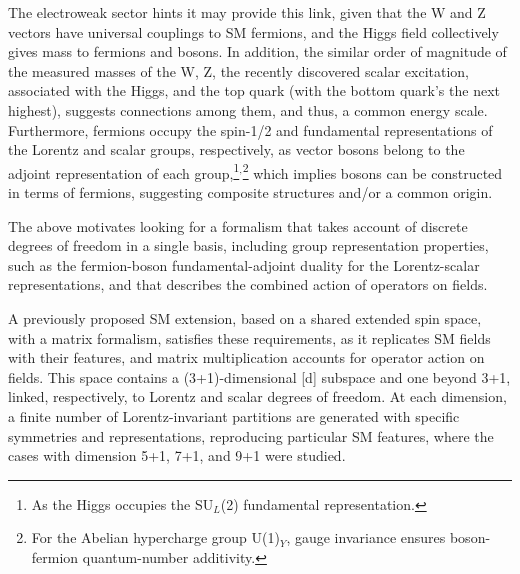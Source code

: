 \documentclass[12pt]{article}
\renewcommand\[{\begin{dmath}}
\renewcommand\]{\end{dmath}}
\begin{document}

 The electroweak sector hints it  may provide this    link, given that  the  W and Z  vectors have  universal couplings to SM fermions, and  the Higgs field  collectively   gives mass to fermions and bosons.
In addition, the similar order of magnitude of the  measured masses\cite{ParticleData}   of  the W, Z,     the recently discovered  scalar  excitation, associated  with
the Higgs\cite{HiggsIndi}, and the top quark (with the bottom quark's  the next highest),
 suggests   connections among them, and thus, a  common  energy  scale.
Furthermore,  fermions occupy the  spin-1/2 and fundamental representations of  the Lorentz and  scalar groups,
   respectively,   as  vector bosons  belong to the    adjoint representation of each group,\footnote{As the Higgs occupies the SU$_L$(2) fundamental representation.}$^,$\footnote{For the Abelian  hypercharge group U(1)$_Y$, gauge invariance ensures boson-fermion  quantum-number  additivity.}   which implies  bosons   can be constructed in terms of fermions,
 suggesting  composite structures and/or a  common  origin.

The above motivates looking for   a formalism that  takes account of discrete degrees of freedom  in a single basis,  including   group representation properties, such as
  the fermion-boson fundamental-adjoint duality for   the Lorentz-scalar  representations, and  that    describes the combined action of operators on fields.

A previously proposed SM extension\cite{BesproIni},   based on a shared  extended spin space, with a matrix formalism,  satisfies these requirements, as it replicates      SM fields with their  features, and matrix multiplication accounts for operator action on fields.
  This  space contains a  (3+1)-dimensional [d] subspace  and   one  beyond 3+1, linked,    respectively, to Lorentz and   scalar degrees of freedom\cite{BesproRicardo}. At each dimension, a finite number of Lorentz-invariant partitions are generated with specific symmetries and representations, reproducing  particular SM features, where the   cases with dimension 5+1\cite{Besprosub}, 7+1\cite{Romero}, and 9+1\cite{bespro9m1}   were studied.

\end{document}
